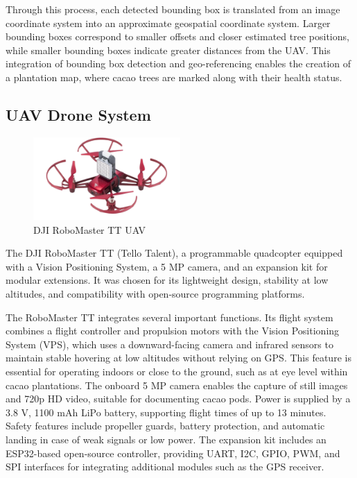 Through this process, each detected bounding box is translated from an image coordinate system into an approximate geospatial coordinate system. Larger bounding boxes correspond to smaller offsets and closer estimated tree positions, while smaller bounding boxes indicate greater distances from the UAV. This integration of bounding box detection and geo-referencing enables the creation of a plantation map, where cacao trees are marked along with their health status.


\subsection*{UAV Drone System}

\begin{figure}[H]
	\centering
	\caption{DJI RoboMaster TT UAV}
	\label{fig:robomaster_tt}
	\includegraphics[width=0.5\textwidth]{figures/Robomaster_TT.pdf}
\end{figure}


The DJI RoboMaster TT (Tello Talent), a programmable quadcopter
equipped with a Vision Positioning System, a 5 MP camera, and an expansion kit for modular extensions.
It was chosen for its lightweight design, stability at low altitudes, and compatibility with open-source
programming platforms.

The RoboMaster TT integrates several important functions. Its flight system combines a flight controller
and propulsion motors with the Vision Positioning System (VPS), which uses a downward-facing camera and
infrared sensors to maintain stable hovering at low altitudes without relying on GPS. This feature is
essential for operating indoors or close to the ground, such as at eye level within cacao plantations.
The onboard 5 MP camera enables the capture of still images and 720p HD video, suitable for documenting
cacao pods. Power is supplied by a 3.8 V, 1100 mAh LiPo battery, supporting flight times of up to
13 minutes. Safety features include propeller guards, battery protection, and automatic landing in case
of weak signals or low power. The expansion kit includes an ESP32-based open-source controller, providing
UART, I2C, GPIO, PWM, and SPI interfaces for integrating additional modules such as the GPS receiver.

